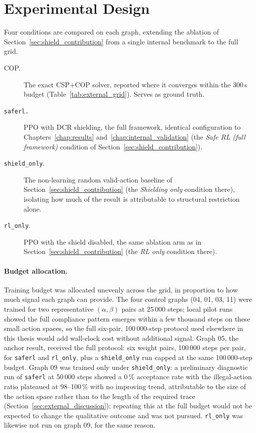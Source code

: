 \section{Experimental Design}
\label{sec:external_design}

Four conditions are compared on each graph, extending the ablation of
Section~\ref{sec:shield_contribution} from a single internal benchmark
to the full grid.

\begin{description}
    \item[COP.] The exact CSP+COP solver, reported where it converges
    within the 300\,s budget (Table~\ref{tab:external_grid}). Serves as
    ground truth.

    \item[\texttt{saferl.}] \ac{PPO} with \ac{DCR}
    shielding, the full framework, identical configuration to
    Chapters~\ref{chap:results} and~\ref{chap:internal_validation} (the
    \emph{Safe \ac{RL} (full framework)} condition of
    Section~\ref{sec:shield_contribution}).

    \item[\texttt{shield\_only}.] The non-learning random
    valid-action baseline of Section~\ref{sec:shield_contribution} (the
    \emph{Shielding only} condition there),
    isolating how much of the result is attributable to structural
    restriction alone.

    \item[\texttt{rl\_only}.] \ac{PPO} with the shield
    disabled, the same ablation arm as in
    Section~\ref{sec:shield_contribution} (the \emph{\ac{RL} only}
    condition there).
\end{description}

\paragraph{Budget allocation.}
Training budget was allocated unevenly across the grid, in proportion
to how much signal each graph can provide. The four control graphs
(04, 01, 03, 11) were trained for two representative
$(\alpha,\beta)$ pairs at 25\,000 steps; local pilot runs showed the
full compliance pattern emerges within a few thousand steps on these
small action spaces, so the full six-pair, 100\,000-step protocol used
elsewhere in this thesis would add wall-clock cost without additional
signal. Graph 05, the anchor result, received the full protocol: six
weight pairs, 100\,000 steps per pair, for \texttt{saferl} and
\texttt{rl\_only}, plus a \texttt{shield\_only} run capped at the same
100\,000-step budget. Graph 09 was trained only under
\texttt{shield\_only}: a preliminary diagnostic run of \texttt{saferl}
at 50\,000 steps showed a 0\,\% acceptance rate with the illegal-action
ratio plateaued at 98--100\,\% with no improving trend, attributable to
the size of the action space rather than to the length of the
required trace (Section~\ref{sec:external_discussion}); repeating this
at the full budget would not be expected to change the qualitative
outcome and was not pursued. \texttt{rl\_only} was likewise not run on
graph 09, for the same reason.

